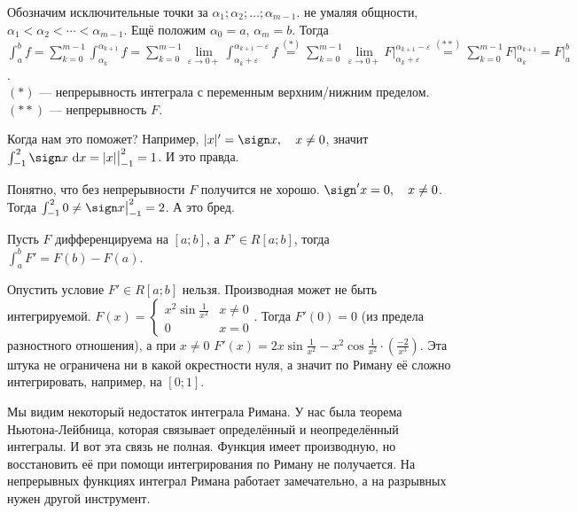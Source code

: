 \documentclass{article}
\begin{document}
\begin{itemize}
        \begin{Proof}
            Обозначим исключительные точки за $\alpha_1;\alpha_2;\ldots;\alpha_{m-1}$. не умаляя общности, $\alpha_1<\alpha_2<\cdots<\alpha_{m-1}$. Ещё положим $\alpha_0=a$, $\alpha_m=b$. Тогда $\int_a^bf=\sum\limits_{k=0}^{m-1}\int_{\alpha_k}^{\alpha_{k+1}}f=\sum\limits_{k=0}^{m-1}\lim\limits_{\varepsilon\to0+}\int_{\alpha_k+\varepsilon}^{\alpha_{k+1}-\varepsilon}f\overset{(*)}=\sum\limits_{k=0}^{m-1}\lim\limits_{\varepsilon\to0+}F\big|_{\alpha_k+\varepsilon}^{\alpha_{k+1}-\varepsilon}\overset{(**)}=\sum\limits_{k=0}^{m-1}F\big|_{\alpha_k}^{\alpha_{k+1}}=F\big|_{a}^{b}$.\\
            $(*)$ --- непрерывность интеграла с переменным верхним/нижним пределом.\\
            $(**)$ --- непрерывность $F$.
        \end{Proof}
        \begin{Example}
            Когда нам это поможет? Например, $|x|'=\sign x,\quad x\neq0$, значит $\int_{-1}^2\sign x~\mathrm dx=|x|\big|_{-1}^2=1$. И это правда.
        \end{Example}
        \begin{Comment}
            Понятно, что без непрерывности $F$ получится не хорошо. $\sign'x=0,\quad x\neq0$. Тогда $\int_{-1}^20\neq\sign x\big|_{-1}^2=2$. А это бред.
        \end{Comment}
        \thm Пусть $F$ дифференцируема на $[a;b]$, а $F'\in R[a;b]$, тогда $\int_a^b F'=F(b)-F(a)$.
        \begin{Comment}
            Опустить условие $F'\in R[a;b]$ нельзя. Производная может не быть интегрируемой. $F(x)=\begin{cases}
                x^2\sin\frac1{x^2} & x\neq 0\\
                0 & x=0
            \end{cases}$. Тогда $F'(0)=0$ (из предела разностного отношения), а при $x\neq 0$ $F'(x)=2x\sin\frac1{x^2}-x^2\cos\frac1{x^2}\cdot\left(\frac{-2}{x^3}\right)$. Эта штука не ограничена ни в какой окрестности нуля, а значит по Риману её сложно интегрировать, например, на $[0;1]$.
        \end{Comment}
        \begin{Comment}
            Мы видим некоторый недостаток интеграла Римана. У нас была теорема Ньютона-Лейбница, которая связывает определённый и неопределённый интегралы. И вот эта связь не полная. Функция имеет производную, но восстановить её при помощи интегрирования по Риману не получается. На непрерывных функциях интеграл Римана работает замечательно, а на разрывных нужен другой инструмент.\\

\end{Comment}
\end{itemize}
\end{document}
